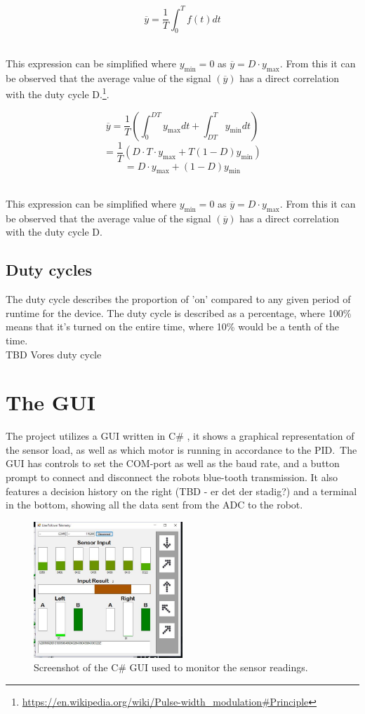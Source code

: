 $$\overline{y}=\frac{1}{T}\int_{0}^{T}f(t)dt$$\

This expression can be simplified where $y_\mathrm{min}=0$ as $\overline{y}=D \cdot y_\mathrm{max}$. From this it can be observed that the average value of the signal $(\overline{y})$ has a direct correlation with the duty cycle D.\footnote{\url{https://en.wikipedia.org/wiki/Pulse-width_modulation\#Principle}}.
 
 $$\overline{y}=\frac{1}{T}\left(\int_{0}^{DT}y_\mathrm{max}dt+\int_{DT}^{T}y_\mathrm{min}dt\right)$$
 $$=\frac{1}{T}\left(D \cdot T \cdot y_\mathrm{max}+T(1-D)y_\mathrm{min}\right)$$
 $$=D \cdot y_\mathrm{max}+\left(1-D\right)y_\mathrm{min}$$\
 
This expression can be simplified where $y_\mathrm{min}=0$ as $\overline{y}=D \cdot y_\mathrm{max}$. From this it can be observed that the average value of the signal $(\overline{y})$ has a direct correlation with the duty cycle D. 

\subsection{Duty cycles}
The duty cycle describes the proportion of 'on' compared to any given period of runtime for the device. The duty cycle is described as a percentage, where 100\% means that it's turned on the entire time, where 10\% would be a tenth of the time.\\
TBD Vores duty cycle

\section{The GUI}
The project utilizes a GUI written in C\# , it shows a graphical representation of the sensor load, as well as which motor is running in accordance to the PID.\
The GUI has controls to set the COM-port as well as the baud rate, and a button prompt to connect and disconnect the robots blue-tooth transmission. It also features a decision history on the right (TBD - er det der stadig?) and a terminal in the bottom, showing all the data sent from the ADC to the robot.

\begin{figure}[h!]
  \centering
  \includegraphics[width=0.5\textwidth]{figures/guiexample.png}  
\caption{Screenshot of the C\# GUI used to monitor the sensor readings.}  
  \label{PID controller}
\end{figure}